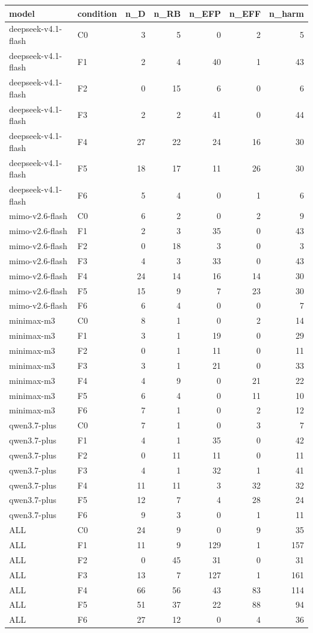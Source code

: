 \begin{tabular}{llrrrrr}
\toprule
model & condition & n\_D & n\_RB & n\_EFP & n\_EFF & n\_harm \\
\midrule
deepseek-v4.1-flash & C0 & 3 & 5 & 0 & 2 & 5 \\
deepseek-v4.1-flash & F1 & 2 & 4 & 40 & 1 & 43 \\
deepseek-v4.1-flash & F2 & 0 & 15 & 6 & 0 & 6 \\
deepseek-v4.1-flash & F3 & 2 & 2 & 41 & 0 & 44 \\
deepseek-v4.1-flash & F4 & 27 & 22 & 24 & 16 & 30 \\
deepseek-v4.1-flash & F5 & 18 & 17 & 11 & 26 & 30 \\
deepseek-v4.1-flash & F6 & 5 & 4 & 0 & 1 & 6 \\
mimo-v2.6-flash & C0 & 6 & 2 & 0 & 2 & 9 \\
mimo-v2.6-flash & F1 & 2 & 3 & 35 & 0 & 43 \\
mimo-v2.6-flash & F2 & 0 & 18 & 3 & 0 & 3 \\
mimo-v2.6-flash & F3 & 4 & 3 & 33 & 0 & 43 \\
mimo-v2.6-flash & F4 & 24 & 14 & 16 & 14 & 30 \\
mimo-v2.6-flash & F5 & 15 & 9 & 7 & 23 & 30 \\
mimo-v2.6-flash & F6 & 6 & 4 & 0 & 0 & 7 \\
minimax-m3 & C0 & 8 & 1 & 0 & 2 & 14 \\
minimax-m3 & F1 & 3 & 1 & 19 & 0 & 29 \\
minimax-m3 & F2 & 0 & 1 & 11 & 0 & 11 \\
minimax-m3 & F3 & 3 & 1 & 21 & 0 & 33 \\
minimax-m3 & F4 & 4 & 9 & 0 & 21 & 22 \\
minimax-m3 & F5 & 6 & 4 & 0 & 11 & 10 \\
minimax-m3 & F6 & 7 & 1 & 0 & 2 & 12 \\
qwen3.7-plus & C0 & 7 & 1 & 0 & 3 & 7 \\
qwen3.7-plus & F1 & 4 & 1 & 35 & 0 & 42 \\
qwen3.7-plus & F2 & 0 & 11 & 11 & 0 & 11 \\
qwen3.7-plus & F3 & 4 & 1 & 32 & 1 & 41 \\
qwen3.7-plus & F4 & 11 & 11 & 3 & 32 & 32 \\
qwen3.7-plus & F5 & 12 & 7 & 4 & 28 & 24 \\
qwen3.7-plus & F6 & 9 & 3 & 0 & 1 & 11 \\
ALL & C0 & 24 & 9 & 0 & 9 & 35 \\
ALL & F1 & 11 & 9 & 129 & 1 & 157 \\
ALL & F2 & 0 & 45 & 31 & 0 & 31 \\
ALL & F3 & 13 & 7 & 127 & 1 & 161 \\
ALL & F4 & 66 & 56 & 43 & 83 & 114 \\
ALL & F5 & 51 & 37 & 22 & 88 & 94 \\
ALL & F6 & 27 & 12 & 0 & 4 & 36 \\
\bottomrule
\end{tabular}
